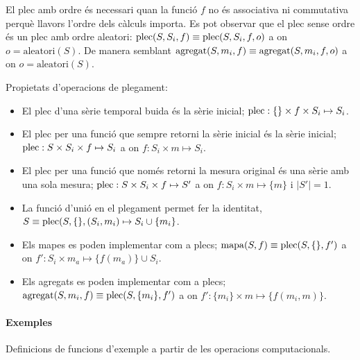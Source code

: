 El plec amb ordre és necessari quan la funció $f$ no és associativa ni
commutativa perquè llavors l'ordre dels càlculs importa. Es pot
observar que el plec sense ordre és un plec amb ordre aleatori:
$\operatorname*{plec}(S,S_i,f)\equiv \operatorname*{plec}(S,S_i,f,o)$ a on $o=\text{aleatori}(S)$.
De manera semblant $\operatorname*{agregat}(S,m_i,f)\equiv \operatorname*{agregat}(S,m_i,f,o)$ a on
$o=\text{aleatori}(S)$.



Propietats d'operacions de plegament:
\begin{itemize}
\item El plec d'una sèrie temporal buida és la sèrie inicial; $\operatorname*{plec}:
  \{\} \times f \times S_i \mapsto S_i$.

\item El plec per una funció que sempre retorni la sèrie inicial és la
  sèrie inicial; $\operatorname*{plec}: S \times S_i \times f \mapsto S_i$ a on
  $f: S_i \times m \mapsto S_i$.

\item El plec per una funció que només retorni la mesura original és
  una sèrie amb una sola mesura; $\operatorname*{plec}: S \times S_i \times f \mapsto
  S'$ a on $f:S_i\times m \mapsto \{m\}$ i $|S'|=1$.


\item La funció d'unió en el plegament permet fer la identitat, $S
  \equiv \operatorname*{plec}(S,\{\},(S_i,m_i) \mapsto S_i \cup \{m_i\}$.


\item Els mapes es poden implementar com a plecs; $\operatorname*{mapa}(S,f) \equiv
  \operatorname*{plec}(S,\{\},f')$ a on $f': S_i \times m_a \mapsto \{f(m_a)\}
  \cup S_i$. 

\item Els agregats es poden implementar com a plecs; $\operatorname*{agregat}(S,m_i,f)
  \equiv \operatorname*{plec}(S,\{m_i\},f')$ a on $f': \{m_i\} \times m \mapsto
  \{f(m_i,m)\}$.



\end{itemize}


\paragraph{Exemples} Definicions de funcions d'exemple a partir de les
operacions computacionals.

